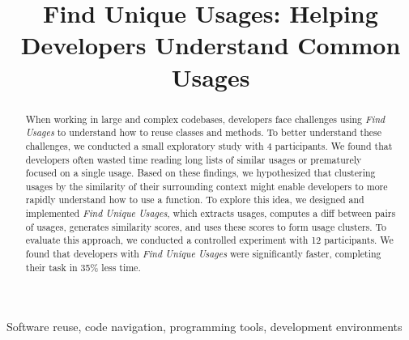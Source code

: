 \documentclass[conference]{IEEEtran}
\begin{document}
\title{Find Unique Usages: Helping Developers Understand Common Usages}




\author{
\and
{}
\and
{}
}

\maketitle

\begin{abstract}
When working in large and complex codebases, developers face challenges using \textit{Find Usages} to understand how to reuse classes and methods. To better understand these challenges, we conducted a small exploratory study with 4 participants. We found that developers often wasted time reading long lists of similar usages or prematurely focused on a single usage. Based on these findings, we hypothesized that clustering usages by the similarity of their surrounding context might enable developers to more rapidly understand how to use a function. To explore this idea, we designed and implemented \textit{Find Unique Usages}, which extracts usages, computes a diff between pairs of usages, generates similarity scores, and uses these scores to form usage clusters. To evaluate this approach, we conducted a controlled experiment with 12 participants. We found that developers with \textit{Find Unique Usages} were  significantly  faster,  completing  their  task  in  35\%  less time.
\end{abstract}



\begin{IEEEkeywords}
Software reuse, code navigation, programming tools, development environments
\end{IEEEkeywords}
\end{document}
